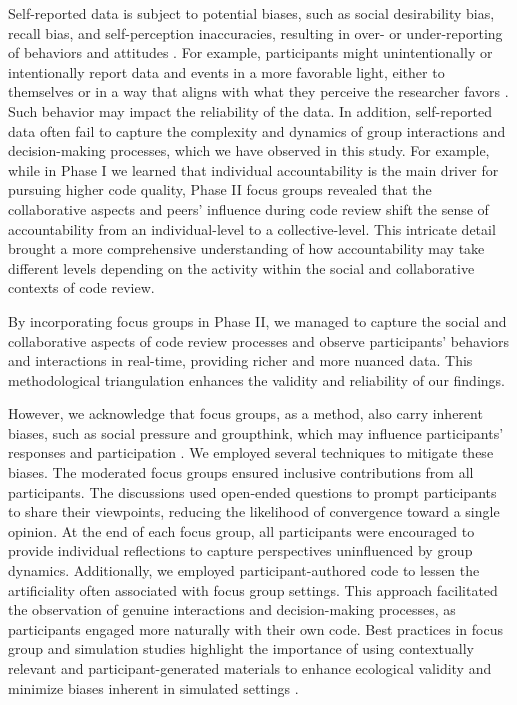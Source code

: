 Self-reported data is subject to potential biases, such as social desirability bias, recall bias, and self-perception inaccuracies, resulting in over- or under-reporting of behaviors and attitudes \citep{podsakoff2003common}. For example, participants might unintentionally or intentionally report data and events in a more favorable light, either to themselves or in a way that aligns with what they perceive the researcher favors \citep{stone1999science,podsakoff2003common}. Such behavior may impact the reliability of the data. In addition, self-reported data often fail to capture the complexity and dynamics of group interactions and decision-making processes, which we have observed in this study. For example, while in Phase I we learned that individual accountability is the main driver for pursuing higher code quality, Phase II focus groups revealed that the collaborative aspects and peers' influence during code review shift the sense of accountability from an individual-level to a collective-level. This intricate detail brought a more comprehensive understanding of how accountability may take different levels depending on the activity within the social and collaborative contexts of code review.

By incorporating focus groups in Phase II, we managed to capture the social and collaborative aspects of code review processes and observe participants' behaviors and interactions in real-time, providing richer and more nuanced data. This methodological triangulation \citep{perlesz2003methodological} enhances the validity and reliability of our findings. 

However, we acknowledge that focus groups, as a method, also carry inherent biases, such as social pressure and groupthink, which may influence participants' responses and participation \citep{o2018use}. We employed several techniques to mitigate these biases. The moderated focus groups ensured inclusive contributions from all participants. The discussions used open-ended questions to prompt participants to share their viewpoints, reducing the likelihood of convergence toward a single opinion. At the end of each focus group, all participants were encouraged to provide individual reflections to capture perspectives uninfluenced by group dynamics. Additionally, we employed participant-authored code to lessen the artificiality often associated with focus group settings. This approach facilitated the observation of genuine interactions and decision-making processes, as participants engaged more naturally with their own code. Best practices in focus group and simulation studies highlight the importance of using contextually relevant and participant-generated materials to enhance ecological validity and minimize biases inherent in simulated settings \citep{gaba2004future}.

